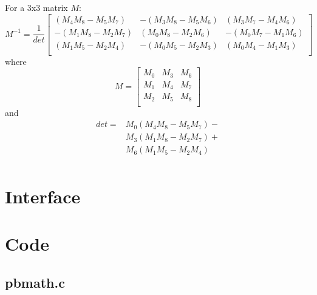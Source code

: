 For a 3x3 matrix $M$:\\

\begin{equation}
M^{-1}=\frac{1}{det}\left[\begin{array}{ccc}
(M_4M_8-M_5M_7)&-(M_3M_8-M_5M_6)&(M_3M_7-M_4M_6)\\
-(M_1M_8-M_2M_7)&(M_0M_8-M_2M_6)&-(M_0M_7-M_1M_6)\\
(M_1M_5-M_2M_4)&-(M_0M_5-M_2M_3)&(M_0M_4-M_1M_3)\\
\end{array}\right]
\end{equation}
where
\begin{equation}
M=\left[\begin{array}{ccc}
M_0&M_3&M_6\\
M_1&M_4&M_7\\
M_2&M_5&M_8\\
\end{array}\right]
\end{equation}
and
\begin{equation}
\begin{array}{ll}
det=&M_0(M_4M_8-M_5M_7)-\\
&M_3(M_1M_8-M_2M_7)+\\
&M_6(M_1M_5-M_2M_4)\\
\end{array}
\end{equation}

\section{Interface}

\begin{scriptsize}
\begin{ttfamily}

\end{ttfamily}
\end{scriptsize}

\section{Code}

\subsection{pbmath.c}

\begin{scriptsize}
\begin{ttfamily}

\end{ttfamily}
\end{scriptsize}

